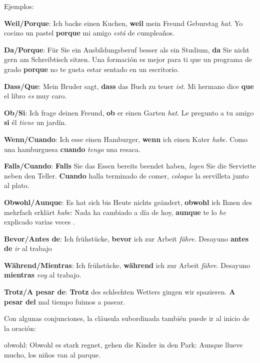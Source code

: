 Ejemplos: 
\begin{myitemize}
\item \textbf{Weil/Porque}: Ich backe einen Kuchen, \textbf{weil} mein Freund Geburstag \textit{hat}. Yo cocino un pastel \textbf{porque} mi amigo \textit{está} de cumpleaños.
\item \textbf{Da/Porque}: Für Sie ein Ausbildungsberuf besser als ein Studium, \textbf{da} Sie nicht gern am Schreibtisch sitzen. Una formación es mejor para ti que un programa de grado \textbf{porque} no te gusta estar sentado en un escritorio.
\item \textbf{Dass/Que}: Mein Bruder sagt, \textbf{dass} das Buch zu teuer \textit{ist}. Mi hermano dice \textbf{que} el libro \textit{es} muy caro.
\item \textbf{Ob/Si}: Ich frage deinen Freund, \textbf{ob} er einen Garten \textit{hat}. Le pregunto a tu amigo \textbf{si} él \textit{tiene} un jardín.
\item \textbf{Wenn/Cuando}: Ich esse einen Hamburger, \textbf{wenn} ich einen Kater \textit{habe}. Como una hamburguesa \textbf{cuando} \textit{tengo} una resaca.
\item \textbf{Falls/Cuando}: \textbf{Falls} Sie das Essen bereits beendet haben, \textit{legen} Sie die Serviette neben den Teller. \textbf{Cuando} halla terminado de comer, \textit{coloque} la servilleta junto al plato.
\item \textbf{Obwohl/Aunque}: Es hat sich bis Heute nichts geändert, \textbf{obwohl} ich Ihnen des mehrfach erklärt \textit{habe}: Nada ha cambiado a día de hoy, \textbf{aunque} te lo \textit{he} explicado varias veces .
\item \textbf{Bevor/Antes de}: Ich frühstücke, \textbf{bevor} ich zur Arbeit \textit{fähre}. Desayuno \textbf{antes de} \textit{ir} al trabajo
\item \textbf{Während/Mientras}: Ich frühstücke, \textbf{während} ich zur Arbeit \textit{fähre}. Desayuno \textbf{mientras} \textit{voy} al trabajo.
\item \textbf{Trotz/A pesar de}: \textbf{Trotz} des schlechten Wetters gingen wir spazieren. \textbf{A pesar del} mal tiempo fuimos a pasear.
\end{myitemize}

Con algunas conjunciones, la cláusula subordinada también puede ir al inicio de la oración:
\begin{myitemize}
\item obwohl: Obwohl es stark regnet, gehen die Kinder in den Park: Aunque llueve mucho, los niños van al parque.
\end{myitemize}



